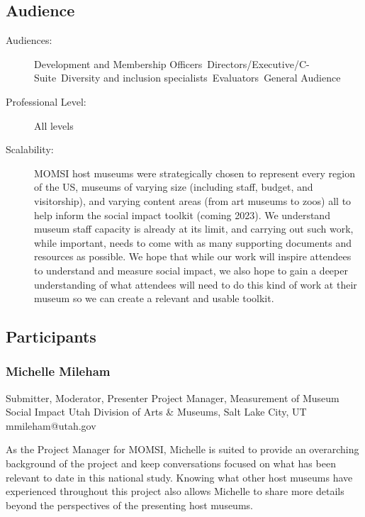 \documentclass{report}
\begin{document}
              \subsection*{Audience}
                \begin{description}
                  \item [Audiences:]Development and Membership Officers~Directors/Executive/C-Suite~Diversity and inclusion specialists~Evaluators~General Audience~
                  \item[Professional Level:]All levels~
                \item[Scalability:] MOMSI host museums were strategically chosen to represent every region of the US, museums of varying size (including staff, budget, and visitorship), and varying content areas (from art museums to zoos) all to help inform the social impact toolkit (coming 2023). We understand museum staff capacity is already at its limit, and carrying out such work, while important, needs to come with as many supporting documents and resources as possible. We hope that while our work will inspire attendees to understand and measure social impact, we also hope to gain a deeper understanding of what attendees will need to do this kind of work at their museum so we can create a relevant and usable toolkit.

							
              \end{description}
            \subsection*{Participants}
              \subsubsection*{ Michelle Mileham }
              Submitter, Moderator, Presenter\newline
              Project Manager, Measurement of Museum Social Impact\newline
              Utah Division of Arts \& Museums, Salt Lake City, UT
              \newline
              mmileham@utah.gov\newline
              
              

              As the Project Manager for MOMSI, Michelle is suited to provide an overarching background of the project and keep conversations focused on what has been relevant to date in this national study. Knowing what other host museums have experienced throughout this project also allows Michelle to share more details beyond the perspectives of the presenting host museums.\newline
\end{document}
